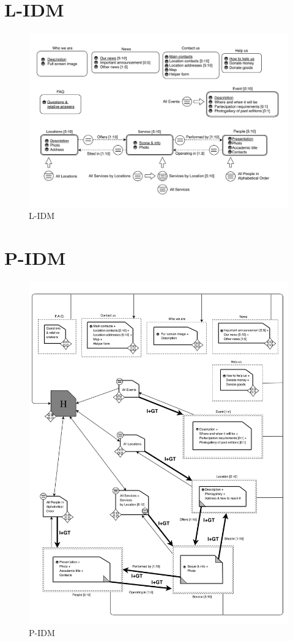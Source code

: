 \section{L-IDM}
%
\begin{figure}[h]
\includegraphics[width=1.3\textwidth, center]{MainMatter/images/L-IDM.jpg}
\caption{L-IDM}
\label{fig:figure2}
\end{figure}
%
\section{P-IDM}
%
\begin{figure}[h]
\includegraphics[width=1.13\textwidth, center]{MainMatter/images/P-IDM.jpg}
\caption{P-IDM}
\label{fig:figure3}
\end{figure}
